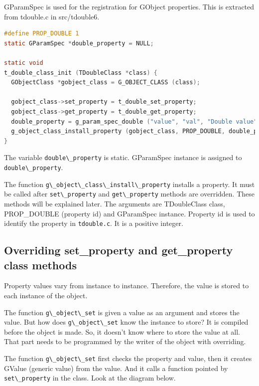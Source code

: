 GParamSpec is used for the registration for GObject properties. This is
extracted from tdouble.c in src/tdouble6.

\begin{lstlisting}[language=C]
#define PROP_DOUBLE 1
static GParamSpec *double_property = NULL;

static void
t_double_class_init (TDoubleClass *class) {
  GObjectClass *gobject_class = G_OBJECT_CLASS (class);

  gobject_class->set_property = t_double_set_property;
  gobject_class->get_property = t_double_get_property;
  double_property = g_param_spec_double ("value", "val", "Double value", -G_MAXDOUBLE, G_MAXDOUBLE, 0.0, G_PARAM_READWRITE);
  g_object_class_install_property (gobject_class, PROP_DOUBLE, double_property);
}
\end{lstlisting}

The variable \passthrough{\lstinline!double\_property!} is static.
GParamSpec instance is assigned to
\passthrough{\lstinline!double\_property!}.

The function
\passthrough{\lstinline!g\_object\_class\_install\_property!} installs a
property. It must be called after
\passthrough{\lstinline!set\_property!} and
\passthrough{\lstinline!get\_property!} methods are overridden. These
methods will be explained later. The arguments are TDoubleClass class,
PROP\_DOUBLE (property id) and GParamSpec instance. Property id is used
to identify the property in \passthrough{\lstinline!tdouble.c!}. It is a
positive integer.

\subsection{Overriding set\_property and get\_property class
methods}\label{overriding-set_property-and-get_property-class-methods}

Property values vary from instance to instance. Therefore, the value is
stored to each instance of the object.

The function \passthrough{\lstinline!g\_object\_set!} is given a value
as an argument and stores the value. But how does
\passthrough{\lstinline!g\_object\_set!} know the instance to store? It
is compiled before the object is made. So, it doesn't know where to
store the value at all. That part needs to be programmed by the writer
of the object with overriding.

The function \passthrough{\lstinline!g\_object\_set!} first checks the
property and value, then it creates GValue (generic value) from the
value. And it calls a function pointed by
\passthrough{\lstinline!set\_property!} in the class. Look at the
diagram below.

